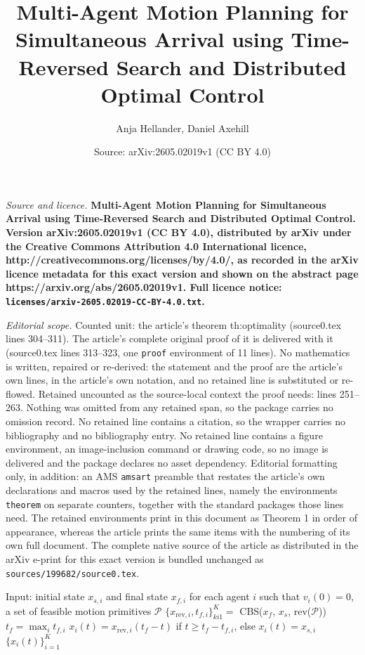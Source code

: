 \documentclass[10pt,a4paper]{amsart}
\title{\LARGE \bf Multi-Agent Motion Planning for Simultaneous Arrival using Time-Reversed Search and Distributed Optimal Control}
\author{Anja Hellander, Daniel Axehill}
\date{Source: arXiv:2605.02019v1 (CC BY 4.0)}
\begin{document}
\maketitle

\noindent\emph{Source and licence.} \LARGE \bf Multi-Agent Motion Planning for Simultaneous Arrival using Time-Reversed Search and Distributed Optimal Control. Version arXiv:2605.02019v1 (CC BY 4.0), distributed by arXiv under the Creative Commons Attribution 4.0 International licence, http://creativecommons.org/licenses/by/4.0/, as recorded in the arXiv licence metadata for this exact version and shown on the abstract page https://arxiv.org/abs/2605.02019v1. Full licence notice: \texttt{licenses/arxiv-2605.02019-CC-BY-4.0.txt}.\par\smallskip

\noindent\textit{Editorial scope.} Counted unit: the article's theorem th:optimality (source0.tex lines 304--311). The article's complete original proof of it is delivered with it (source0.tex lines 313--323, one \texttt{proof} environment of 11 lines). No mathematics is written, repaired or re-derived: the statement and the proof are the article's own lines, in the article's own notation, and no retained line is substituted or re-flowed.  Retained uncounted as the source-local context the proof needs: lines 251--263.  Nothing was omitted from any retained span, so the package carries no omission record.  No retained line contains a citation, so the wrapper carries no bibliography and no bibliography entry.  No retained line contains a figure environment, an image-inclusion command or drawing code, so no image is delivered and the package declares no asset dependency.  Editorial formatting only, in addition: an AMS \texttt{amsart} preamble that restates the article's own declarations and macros used by the retained lines, namely the environments \texttt{theorem} on separate counters, together with the standard packages those lines need.  The retained environments print in this document as Theorem 1 in order of appearance, whereas the article prints the same items with the numbering of its own full document.  The complete native source of the article as distributed in the arXiv e-print for this exact version is bundled unchanged as \texttt{sources/199682/source0.tex}.
\begin{algorithm}[tb]
\caption{MAMP with simultaneous arrival}
\label{alg:sim-mamp}
\begin{algorithmic}[1]
\State Input: initial state $x_{s, i}$ and final state $x_{f, i}$ for each agent $i$ such that $v_{i}(0) = 0$, a set of feasible motion primitives $\mathcal{P}$
\State $\{x_{\text{rev}, i}, t_{f, i}\}_{ki1}^K = $ CBS($x_f$, $x_s$, rev($\mathcal{P}$))
\State $t_{f} = \max_i t_{f, i}$
	\State $x_i(t) = x_{\text{rev}, i}(t_{f}-t)$ if $t \geq t_f - t_{f, i}$, else $x_i(t) = x_{s, i}$
\EndFor
\State \Return $\{x_i(t)\}_{i=1}^K$
\end{algorithmic}
\end{algorithm}
\end{document}
